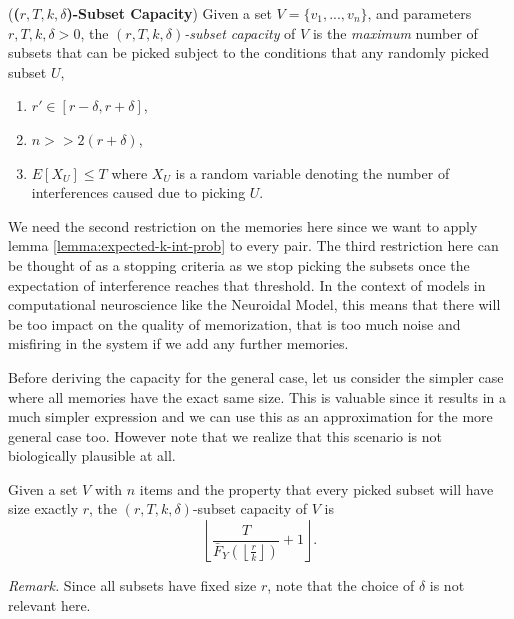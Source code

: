     \begin{definition} (\textbf{(\textit{$r,T,k,\delta$})-Subset Capacity}) Given a set $V = \{v_1,...,v_n\}$, and parameters $r, T, k, \delta > 0$, the \textit{$(r,T,k,\delta)$-subset capacity} of $V$ is the \textit{maximum} number of subsets that can be picked subject to the conditions that any randomly picked subset $U$,
        \begin{enumerate}
            \item $r' \in [r-\delta,r+\delta]$,
            \item $n >> 2(r+\delta)$,
            \item \label{equ:cap-bound-expected}$E[X_U] \le T$ where $X_U$ is a random variable denoting the number of interferences caused due to picking $U$. 
        \end{enumerate}
    \end{definition}

    We need the second restriction on the memories here since we want to apply lemma \ref{lemma:expected-k-int-prob} to every pair. The third restriction here can be thought of as a stopping criteria as we stop picking the subsets once the expectation of interference reaches that threshold. In the context of models in computational neuroscience like the Neuroidal Model, this means that there will be too impact on the quality of memorization, that is too much noise and misfiring in the system if we add any further memories.
    
    Before deriving the capacity for the general case, let us consider the simpler case where all memories have the exact same size. This is valuable since it results in a much simpler expression and we can use this as an approximation for the more general case too. However note that we realize that this scenario is not biologically plausible at all. 

    \begin{theorem}
        \label{thm:exact-r}
        Given a set $V$ with $n$ items and the property that every picked subset will have size exactly $r$, the $(r,T,k,\delta)$-subset capacity of $V$ is 
        \begin{equation*}
            \left\lfloor \frac{T}{\bar{F}_Y\left(\left\lfloor \frac{r}{k} \right\rfloor\right)} + 1 \right\rfloor.
        \end{equation*}
    \end{theorem}

    \textit{Remark.} Since all subsets have fixed size $r$, note that the choice of $\delta$ is not relevant here.

